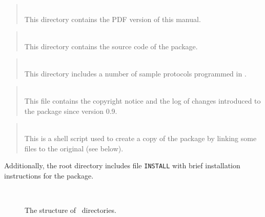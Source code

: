 \medskip

\begin{quote}
\noindent{}\\ \hspace{0in}
This directory contains the PDF version of this manual.
\end{quote}

\begin{quote}
\noindent{}\\ \hspace{0in}
This directory contains the source code of the package.
\end{quote}

\begin{quote}
\noindent{}\\ \hspace{0in}
This directory includes a number of sample protocols programmed in
\smurph.
\end{quote}

\begin{quote}
\noindent{}\\ \hspace{0in}
This file contains the copyright notice and the log of changes
introduced to the package since version 0.9.
\end{quote}

\begin{quote}
\noindent{}\\ \hspace{0in}
This is a shell script used to create a copy of the package by
linking some files to the original (see below).
\end{quote}\medskip

Additionally, the root directory includes file {\tt INSTALL} with
brief installation instructions for the package.

\begin{figure}
\begin{center}
\ 
\caption{The structure of \smurph\ directories.}%
\end{center}%
\end{figure}%

